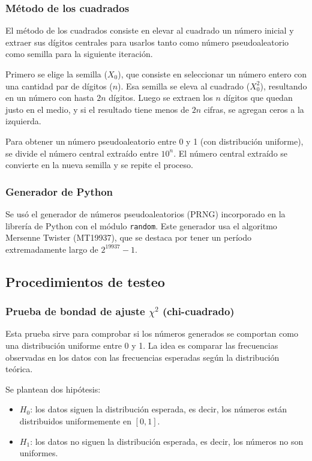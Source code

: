\documentclass{article}
\begin{document}
\subsubsection{Método de los cuadrados}

El método de los cuadrados consiste en elevar al cuadrado un número inicial y extraer sus dígitos centrales para usarlos tanto como número pseudoaleatorio como semilla para la siguiente iteración.

Primero se elige la semilla ($X_0$), que consiste en seleccionar un número entero con una cantidad par de dígitos ($n$). Esa semilla se eleva al cuadrado ($X_0^2$), resultando en un número con hasta $2n$ dígitos. Luego se extraen los $n$ dígitos que quedan justo en el medio, y si el resultado tiene menos de $2n$ cifras, se agregan ceros a la izquierda.

Para obtener un número pseudoaleatorio entre 0 y 1 (con distribución uniforme), se divide el número central extraído entre $10^n$. El número central extraído se convierte en la nueva semilla y se repite el proceso.

\subsubsection{Generador de Python}

Se usó el generador de números pseudoaleatorios (PRNG) incorporado en la librería de Python con el módulo \texttt{random}. Este generador usa el algoritmo Mersenne Twister (MT19937), que se destaca por tener un período extremadamente largo de $2^{19937}-1$.

\subsection{Procedimientos de testeo}

\subsubsection{Prueba de bondad de ajuste $\chi^2$ (chi-cuadrado)}

Esta prueba sirve para comprobar si los números generados se comportan como una distribución uniforme entre 0 y 1. La idea es comparar las frecuencias observadas en los datos con las frecuencias esperadas según la distribución teórica.

Se plantean dos hipótesis:

\begin{itemize}
  \item $H_0$: los datos siguen la distribución esperada, es decir, los números están distribuidos uniformemente en $[0,1]$.
  \item $H_1$: los datos no siguen la distribución esperada, es decir, los números no son uniformes.
\end{itemize}
\end{document}
